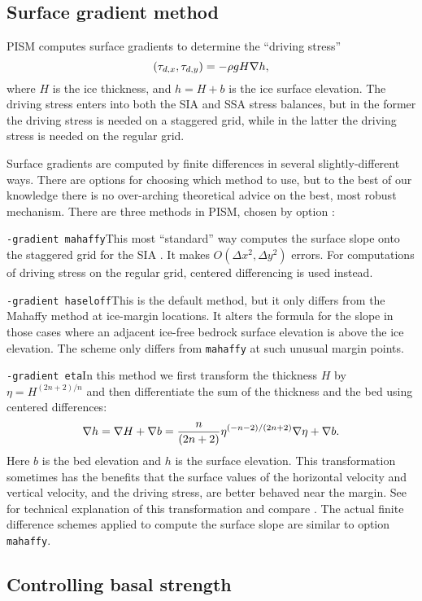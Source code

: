 \subsection{Surface gradient method} \label{subsect:gradient}  PISM computes surface gradients to determine the ``driving stress''
	$$(\tau_{d,x},\tau_{d,y}) = - \rho g H \nabla h,$$
where $H$ is the ice thickness, and $h = H+b$ is the ice surface elevation.  The driving stress enters into both the SIA and SSA stress balances, but in the former the driving stress is needed on a staggered grid, while in the latter the driving stress is needed on the regular grid.

Surface gradients are computed by finite differences in several slightly-different ways.  There are options for choosing which method to use, but to the best of our knowledge there is no over-arching theoretical advice on the best, most robust mechanism.  There are three methods in PISM, chosen by option :

\noindent\texttt{-gradient mahaffy}\quad  This most ``standard'' way computes the surface slope onto the staggered grid for the SIA \cite{Mahaffy}.  It makes $O(\Delta x^2,\Delta y^2)$ errors.  For computations of driving stress on the regular grid, centered differencing is used instead.

\noindent\texttt{-gradient haseloff}\quad  This is the default method, but it only differs from the Mahaffy method at ice-margin locations.  It alters the formula for the slope in those cases where an adjacent ice-free bedrock surface elevation is above the ice elevation.  The scheme only differs from \texttt{mahaffy} at such unusual margin points.

\noindent\texttt{-gradient eta}\quad  In this method we first transform the thickness $H$ by $\eta = H^{(2n+2)/n}$ and then differentiate the sum of the thickness and the bed using centered differences:
	$$\nabla h = \nabla H + \nabla b = \frac{n}{(2n+2)} \eta^{(-n-2)/(2n+2)} \nabla \eta + \nabla b.$$
Here $b$ is the bed elevation and $h$ is the surface elevation.  This transformation sometimes has the benefits that the surface values of the horizontal velocity and vertical velocity, and the driving stress, are better behaved near the margin.  See \cite{BLKCB,CDDSV} for technical explanation of this transformation and compare \cite{SaitoMargin}.  The actual finite difference schemes applied to compute the surface slope are similar to option \texttt{mahaffy}.


\subsection{Controlling basal strength}  \label{subsect:basestrength}

